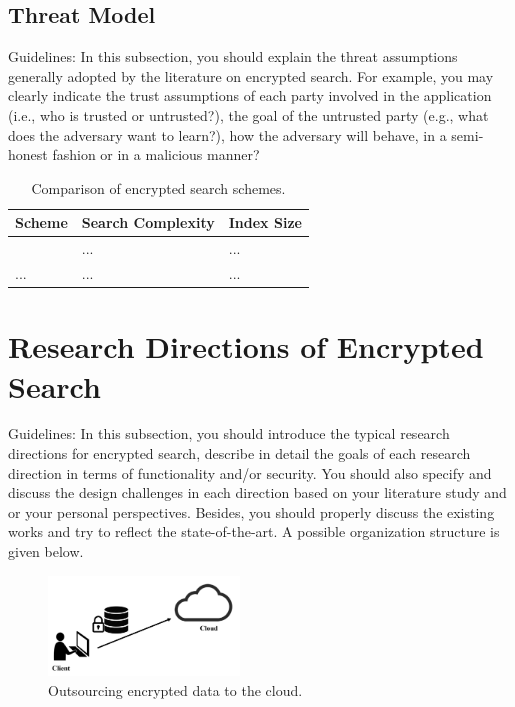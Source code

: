 \documentclass[conference]{IEEEtran}
\begin{document}
\subsection{Threat Model}

Guidelines: In this subsection, you should explain the threat assumptions generally adopted by the literature on encrypted search. For example, you may clearly indicate the trust assumptions of each party involved in the application (i.e., who is trusted or untrusted?), the goal of the untrusted party (e.g., what does the adversary want to learn?), how the adversary will behave, in a semi-honest fashion or in a malicious manner?


\begin{table}[h]
\centering
\caption{Comparison of encrypted search schemes.}
\label{my-label}
\begin{tabular}{|l|l|l|}
\hline
Scheme & Search Complexity & Index Size \\ \hline
\cite{SongWP00}   & ...              & ...       \\ \hline
...    & ...               & ...        \\ \hline
\end{tabular}
\end{table}


\section{Research Directions of Encrypted Search}
%

Guidelines: In this subsection, you should introduce the typical research directions for encrypted search, describe in detail the goals of each research direction in terms of functionality and/or security. You should also specify and discuss the design challenges in each direction based on your literature study and or your personal perspectives. Besides, you should properly discuss the existing works and try to reflect the state-of-the-art. A possible organization structure is given below. 


\begin{figure}[!t]
  \centering
  \includegraphics[width=2in]{./fig1.png}
  \caption{Outsourcing encrypted data to the cloud.}
  \label{fig_model}
\end{figure}
\end{document}
